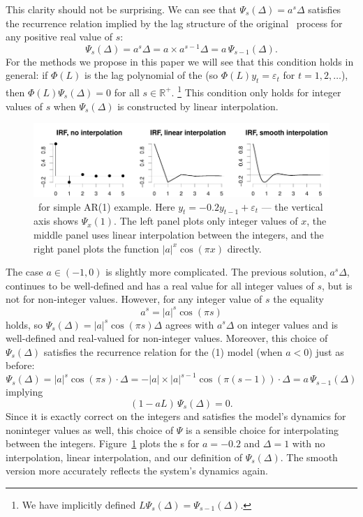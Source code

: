 \documentclass[12pt,fleqn]{article}
\newcommand{\vep}{\varepsilon}
\newcommand{\AR}{\allcaps{AR}}
\newcommand{\RR}{\mathbb{R}}
\begin{document}
This clarity should not be surprising. We can see that $\Psi_s(\Delta)
= a^s \Delta$ satisfies the recurrence relation implied by the lag
structure of the original \AR\ process for any positive real value of
$s$:
\begin{equation*}
  \Psi_s(\Delta) = a^s \Delta = a \times a^{s-1} \Delta = a \, \Psi_{s-1}(\Delta).
\end{equation*}
For the methods we propose in this paper we will see that this
condition holds in general: if $\Phi(L)$ is the lag polynomial of the
\VAR (so $\Phi(L)y_t = \vep_t$ for $t = 1, 2, \dots$), then $\Phi(L)
\Psi_s(\Delta) = 0$ for all $s \in \RR^+$.%
\footnote{We have implicitly defined $L \Psi_s(\Delta) =
  \Psi_{s-1}(\Delta)$.} %
This condition only holds for integer values of $s$ when
$\Psi_s(\Delta)$ is constructed by linear interpolation.

\begin{figure}[t]
  \centering
  \includegraphics{graphs/motivation2.pdf}
  \caption{\IRF\ for simple AR(1) example. Here $y_t = -0.2 y_{t-1} +
    \vep_t$ --- the vertical axis shows $\Psi_x(1)$. The left panel
    plots only integer values of $x$, the middle panel uses linear
    interpolation between the integers, and the right panel plots the
    function $|a|^x \cos(\pi x)$ directly.}
  \label{f0b}
\end{figure}

The case $a \in (-1, 0)$ is slightly more complicated.  The
previous solution, $a^s \Delta$, continues to be well-defined and has a real value
for all integer values of $s$, but is not for non-integer
values. However, for any integer value of $s$ the equality
\begin{equation*}
  a^s = |a|^s \cos(\pi s)
\end{equation*}
holds, so $\Psi_s(\Delta) = |a|^s \cos(\pi s) \Delta$ agrees with $a^s
\Delta$ on integer values and is well-defined and real-valued for
non-integer values. Moreover, this choice of $\Psi_s(\Delta)$
satisfies the recurrence relation for the \AR(1) model (when $a < 0$)
just as before:
\begin{equation*}
  \Psi_s(\Delta) = |a|^s \cos(\pi s) \cdot \Delta = - |a| \times |a|^{s-1} \cos(\pi (s-1)) \cdot \Delta = a \, \Psi_{s-1}(\Delta)
\end{equation*}
implying
\begin{equation*}
  (1 - a L) \, \Psi_s(\Delta) = 0.
\end{equation*}
Since it is exactly correct on the integers and satisfies the model's
dynamics for noninteger values as well, this choice of $\Psi$ is a
sensible choice for interpolating between the
integers. Figure~\ref{f0b} plots the \IRF s for $a = -0.2$ and $\Delta
= 1$ with no interpolation, linear interpolation, and our definition
of $\Psi_s(\Delta)$. The smooth version more accurately reflects the
system's dynamics again.
\end{document}
